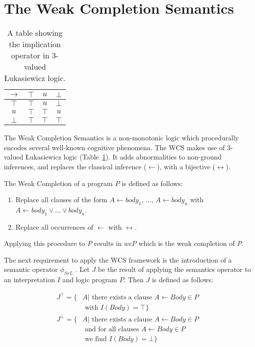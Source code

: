 \section{The Weak Completion Semantics}
\begin{table}
\begin{center}
\begin{tabular}{ c | c c c }
  $\rightarrow$& $\top$ & $u$ & $\bot$ \\ \hline
 $\top$ & $\top$ & $u$ & $\bot$ \\  
 $u$ & $\top$ & $\top$ & $u$\\  
 $\bot$ & $\top$ & $\top$ & $\top$
\end{tabular}
\caption{A table showing the implication operator in 3-valued \L ukasiewicz logic.}
\label{tbl:luk}
\end{center}
\end{table}

The Weak Completion Semantics is a non-monotonic logic which procedurally encodes several well-known cognitive phenomena. The WCS makes use of 3-valued \L ukasiewicz logic (Table~\ref{tbl:luk}). It adds abnormalities to non-ground inferences, and replaces the classical inference ($\leftarrow$), with a bijective ($\leftrightarrow$). 

The Weak Completion of a program $P$ is defined as follows:

\begin{enumerate}
\item Replace all clauses of the form $A \leftarrow body_1$, ..., $A \leftarrow body_n$ with $A \leftarrow body_1 \lor ... \lor body_n$.
\item Replace all occurrences of $\leftarrow$ with $\leftrightarrow$.
\end{enumerate}

Applying this procedure to $P$ results in $wcP$ which is the weak completion of $P$.

The next requirement to apply the WCS framework is the introduction of a semantic operator $\phi_{SvL}$ \citep{stenning2008interpretation}. Let $J$ be the result of applying the semantics operator to an interpretation $I$ and logic program $P$. Then $J$ is defined as follows:

\[
\begin{split}
J^\top = \{ & A | \textrm{ there exists a clause } A\leftarrow Body \in P \\ & \textrm{ with } I(Body) = \top\}
\end{split}
\]
\[
\begin{split}
J^\bot = \{ &  A | \textrm{ there exists a clause } A \leftarrow Body \in P \\
           & \textrm{ and for all clauses } A \leftarrow Body \in P \\ & \textrm{ we find } I(Body) = \bot\}
\end{split}
\]

